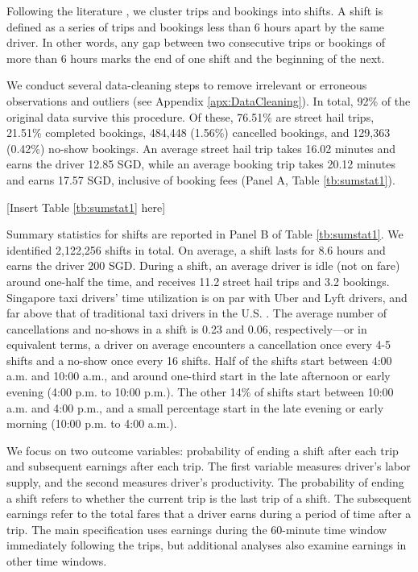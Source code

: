 \documentclass[reviewmode,AEJ]{AEA}
\begin{document}
Following the literature \citep{farber2015you,agarwal2015singaporean,martin2017quit,chen2015dynamic}, we 
cluster trips and bookings into shifts. A shift is defined as a series of trips and bookings less than 6 
hours apart by the same driver. In other words, any gap between two consecutive trips or bookings of more
than 6 hours marks the end of one shift and the beginning of the next. 

We conduct several data-cleaning steps to remove irrelevant or erroneous observations and outliers (see Appendix \ref{apx:DataCleaning}).
In total, %
92\% of the original data survive this procedure. Of these, 76.51\% are
street hail trips, 21.51\% completed bookings, 484,448 (1.56\%) cancelled bookings, and 129,363 (0.42\%) no-show
bookings. An average street hail trip takes 16.02 minutes and earns the driver 12.85 SGD, while an average  
booking trip takes 20.12 minutes and earns 17.57 SGD, inclusive of booking fees (Panel A, Table \ref{tb:sumstat1}).


\begin{center}
	[Insert Table \ref{tb:sumstat1} here]
\end{center}


Summary statistics for shifts are reported in Panel B of Table \ref{tb:sumstat1}. 
We identified 2,122,256 shifts in total. On average, a shift lasts for 8.6 hours and earns the driver 200 SGD. 
During a shift, an average driver is idle (not on fare) around one-half the time, and receives 11.2 street
hail trips and 3.2 bookings.  Singapore taxi drivers' time utilization is on par with Uber and Lyft drivers,
and far above that of traditional taxi drivers in the U.S. \citep{cramer2016disruptive}.
The average number of cancellations and no-shows in a shift is 0.23 and 0.06, respectively---or in equivalent terms,
a driver on average encounters a cancellation once every 4-5 shifts and a no-show once every 16 shifts.
Half of the shifts start between 4:00 a.m. and 10:00 a.m., and around one-third start in the late afternoon 
or early evening (4:00 p.m. to 10:00 p.m.). The other 14\% of shifts start between 10:00 a.m. and 4:00 p.m.,
and a small percentage start in the late evening or early morning (10:00 p.m. to 4:00 a.m.).

We focus on two outcome variables: probability of ending a shift after each trip and subsequent earnings after each trip. The first variable measures driver's labor supply, and the second measures driver's productivity. The probability of ending a shift refers to whether the current trip is the last trip of a shift. The subsequent earnings refer to the total fares that a driver earns during a period of time after a trip. The main specification uses earnings during the 60-minute time window immediately following the trips, but additional analyses also examine earnings in other time windows. 
\end{document}
